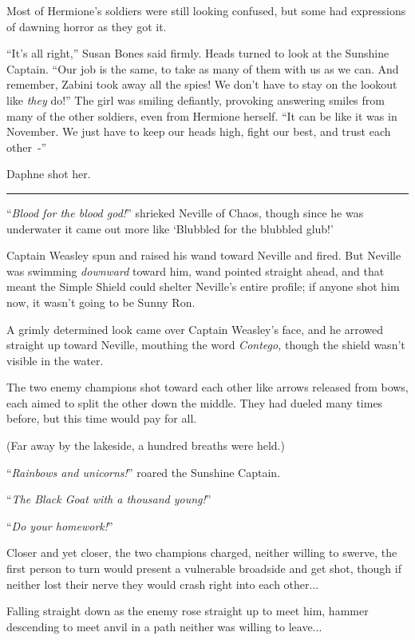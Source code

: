 Most of Hermione's soldiers were still looking confused, but some had expressions of dawning horror as they got it.

``It's all right,'' Susan Bones said firmly. Heads turned to look at the Sunshine Captain. ``Our job is the same, to take as many of them with us as we can. And remember, Zabini took away all the spies! We don't have to stay on the lookout like \emph{they} do!'' The girl was smiling defiantly, provoking answering smiles from many of the other soldiers, even from Hermione herself. ``It can be like it was in November. We just have to keep our heads high, fight our best, and trust each other~-''

Daphne shot her.

\begin{center}\rule{3in}{0.4pt}\end{center}

``\emph{Blood for the blood god!}'' shrieked Neville of Chaos, though since he was underwater it came out more like `Blubbled for the blubbled glub!'

Captain Weasley spun and raised his wand toward Neville and fired. But Neville was swimming \emph{downward} toward him, wand pointed straight ahead, and that meant the Simple Shield could shelter Neville's entire profile; if anyone shot him now, it wasn't going to be Sunny Ron.

A grimly determined look came over Captain Weasley's face, and he arrowed straight up toward Neville, mouthing the word \emph{Contego,} though the shield wasn't visible in the water.

The two enemy champions shot toward each other like arrows released from bows, each aimed to split the other down the middle. They had dueled many times before, but this time would pay for all.

(Far away by the lakeside, a hundred breaths were held.)

``\emph{Rainbows and unicorns!}'' roared the Sunshine Captain.

``\emph{The Black Goat with a thousand young!}''

``\emph{Do your homework!}''

Closer and yet closer, the two champions charged, neither willing to swerve, the first person to turn would present a vulnerable broadside and get shot, though if neither lost their nerve they would crash right into each other...

Falling straight down as the enemy rose straight up to meet him, hammer descending to meet anvil in a path neither was willing to leave...

